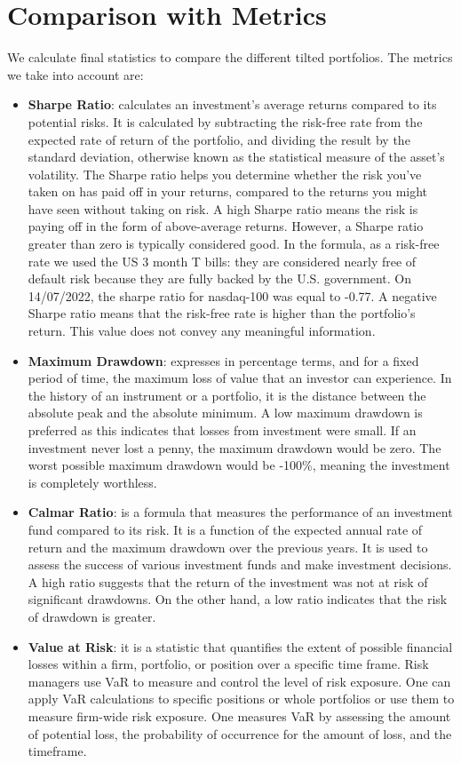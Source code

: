 \documentclass[twocolumn]{article}
\begin{document}
\section{Comparison with Metrics}
We calculate final statistics to compare the different tilted portfolios. The metrics we take into account are:
\begin{itemize}
    \item \textbf{Sharpe Ratio}: calculates an investment's average returns
    compared to its potential risks. It is calculated by subtracting the risk-free rate from the expected rate of return of the portfolio, and dividing the result by the standard deviation, otherwise known as the statistical measure of the asset's volatility. 
    The Sharpe ratio helps you determine whether the risk you've taken on has paid off in your returns, compared to the returns you might have seen without taking on risk. 
    A high Sharpe ratio means the risk is paying off in the form of above-average returns. However, a Sharpe ratio greater than zero is typically considered good. 
    In the formula, as a risk-free rate we used the US 3 month T bills: they are considered nearly free of default risk because they are fully backed by the U.S. government. On 14/07/2022, the sharpe ratio for nasdaq-100 was equal to -0.77. A negative Sharpe ratio means that the risk-free rate is higher than the portfolio's return. This value does not convey any meaningful information.
    \item \textbf{Maximum Drawdown}: expresses in percentage terms, and for a fixed period of time, the maximum loss of value that an investor can experience. In the history of an instrument or a portfolio, it is the distance between the absolute peak and the absolute minimum. A low maximum drawdown is preferred as this indicates that losses from investment were small. If an investment never lost a penny, the maximum drawdown would be zero. The worst possible maximum drawdown would be -100\%, meaning the investment is completely worthless.
    \item \textbf{Calmar Ratio}:  is a formula that measures the performance of an investment fund compared to its risk. It is a function of the expected annual rate of return and the maximum drawdown over the previous years. It is used to assess the success of various investment funds and make investment decisions. A high ratio suggests that the return of the investment was not at risk of significant drawdowns. On the other hand, a low ratio indicates that the risk of drawdown is greater.
    \item \textbf{Value at Risk}: it is a statistic that quantifies the extent of possible financial losses within a firm, portfolio, or position over a specific time frame. Risk managers use VaR to measure and control the level of risk exposure. One can apply VaR calculations to specific positions or whole portfolios or use them to measure firm-wide risk exposure. One measures VaR by assessing the amount of potential loss, the probability of occurrence for the amount of loss, and the timeframe.

\end{itemize}
\end{document}
